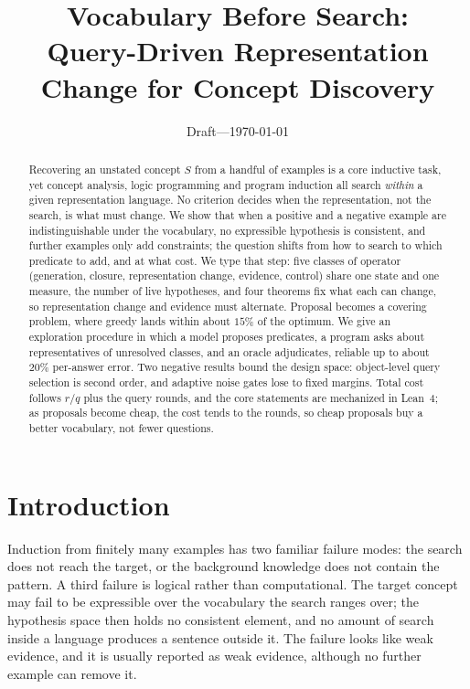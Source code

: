 \documentclass[11pt]{article}
\title{Vocabulary Before Search:\\ Query-Driven Representation Change for Concept Discovery}
\author{}
\date{Draft---\today}
\begin{document}
\maketitle

\begin{abstract}
Recovering an unstated concept $S$ from a handful of examples is a core inductive task, yet concept
analysis, logic programming and program induction all search \emph{within} a given representation
language. No criterion decides when the representation, not the search, is what must change. We show
that when a positive and a negative example are indistinguishable under the vocabulary, no expressible
hypothesis is consistent, and further examples only add constraints; the question shifts from how to
search to which predicate to add, and at what cost. We type that step: five classes of operator
(generation, closure, representation change, evidence, control) share one state and one measure, the
number of live hypotheses, and four theorems fix what each can change, so representation change and
evidence must alternate. Proposal becomes a covering problem, where greedy lands within about $15\%$ of
the optimum. We give an exploration procedure in which a model proposes predicates, a program asks about
representatives of unresolved classes, and an oracle adjudicates, reliable up to about $20\%$
per-answer error. Two negative results bound the design space: object-level query selection is second
order, and adaptive noise gates lose to fixed margins. Total cost follows $r/q$ plus the query rounds,
and the core statements are mechanized in Lean~4; as proposals become cheap, the cost tends to the
rounds, so cheap proposals buy a better vocabulary, not fewer questions.
\end{abstract}

\section{Introduction}

Induction from finitely many examples has two familiar failure modes: the search does not reach the
target, or the background knowledge does not contain the pattern. A third failure is logical rather
than computational. The target concept may fail to be expressible over the vocabulary the search
ranges over; the hypothesis space then holds no consistent element, and no amount of search inside a
language produces a sentence outside it. The failure looks like weak evidence, and it is usually
reported as weak evidence, although no further example can remove it.
\end{document}
